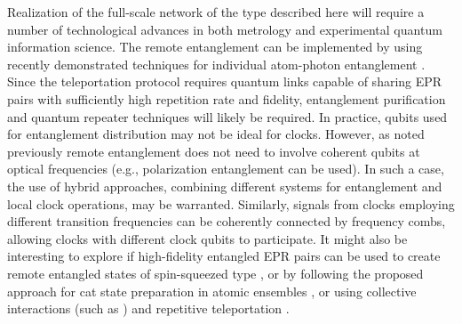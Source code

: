 Realization of the full-scale network of the type described here will require a
number of technological advances in both metrology and experimental quantum
information science. 
The remote entanglement can be implemented by using recently demonstrated
techniques for individual atom-photon entanglement \cite{Olmschenk2009,
Chou2007, togan, Bernien2013, Riste2013}. Since the teleportation protocol
requires quantum links capable of sharing EPR pairs with sufficiently high
repetition rate and fidelity, entanglement purification \cite{Dur1999} and
quantum repeater techniques \cite{duan3} will likely be required. In
practice, qubits used for entanglement distribution may not be ideal for clocks.
 However, as noted previously  remote entanglement does not need to involve
coherent qubits at optical frequencies (e.g., polarization entanglement can be
used). In such a case,   the use of hybrid approaches, combining  different
systems for entanglement and local clock operations, may be warranted.
Similarly, signals from clocks employing different transition frequencies
can be coherently connected by frequency combs, allowing clocks with different
clock qubits to participate.
It might also be interesting to explore if high-fidelity entangled EPR pairs can
be used to create remote entangled states of spin-squeezed type \cite{Leroux2010,
Sherson2006, Ma2012}, or by following the proposed approach for cat state
preparation in atomic ensembles \cite{McConnell2013}, 
or using collective interactions (such as \cite{MSgate}) and repetitive teleportation 
\cite{Andersen2013}.
